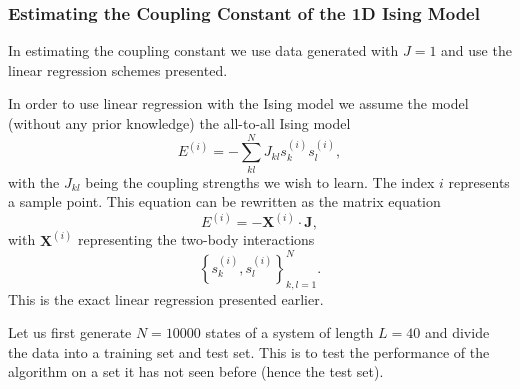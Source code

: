 \documentclass[10pt, t]{beamer}
\begin{document}
\hypertarget{estimating-the-coupling-constant-of-the-1d-ising-model}{%
\subsubsection{Estimating the Coupling Constant of the 1D Ising
Model}\label{estimating-the-coupling-constant-of-the-1d-ising-model}}

In estimating the coupling constant we use data generated with \(J=1\)
and use the linear regression schemes presented.

In order to use linear regression with the Ising model we assume the
model (without any prior knowledge) the all-to-all Ising model
\[E^{(i)} = -\sum\limits_{kl}^NJ_{kl}s^{(i)}_ks^{(i)}_l,\] with the
\(J_{kl}\) being the coupling strengths we wish to learn. The index
\(i\) represents a sample point. This equation can be rewritten as the
matrix equation
\[E^{(i)} = -\boldsymbol{X}^{(i)} \cdot \boldsymbol{J},\] with
\(\boldsymbol{X}^{(i)}\) representing the two-body interactions
\[\left\{s^{(i)}_k,s^{(i)}_l\right\}_{k,l=1}^N.\] This is the exact
linear regression presented earlier.

Let us first generate \(N=10000\) states of a system of length \(L=40\)
and divide the data into a training set and test set. This is to test
the performance of the algorithm on a set it has not seen before (hence
the test set).
\end{document}
